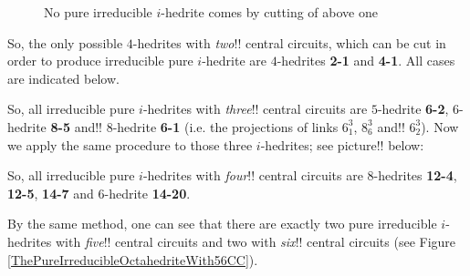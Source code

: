\documentclass[12pt]{article}
\begin{document}
\begin{figure}
\centering
\epsfxsize=40mm
\caption{No pure irreducible $i$-hedrite comes by cutting of above one}
\label{Cutting4hedrite}
\end{figure}



So, the only possible $4$-hedrites with {\em two}!! central circuits, which can
be cut in order to produce irreducible pure $i$-hedrite
are $4$-hedrites {\bf 2-1} and {\bf 4-1}. All cases are indicated below. 

\begin{center}
\epsfxsize=120mm
\end{center}

So, all irreducible pure $i$-hedrites with {\em three}!! central circuits are $5$-hedrite {\bf 6-2}, $6$-hedrite {\bf 8-5} and!! $8$-hedrite {\bf 6-1} (i.e. the projections of links $6^3_1$, $8^3_6$ and!! $6^3_2$).
Now we apply the same procedure to those three $i$-hedrites; see 
picture!! below:

\begin{center}
\epsfxsize=120mm
\end{center}

So, all irreducible pure $i$-hedrites with {\em four}!! central circuits are $8$-hedrites {\bf 12-4}, {\bf 12-5}, {\bf 14-7} and $6$-hedrite {\bf 14-20}.

By the same method, one can see that there are exactly two pure irreducible $i$-hedrites with {\em five}!! central circuits and two with {\em six}!! central circuits (see Figure \ref{ThePureIrreducibleOctahedriteWith56CC}).
\end{document}
